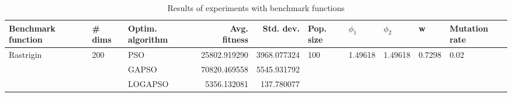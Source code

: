 \begin{table}
\centering
\caption{Results of experiments with benchmark functions}
\begin{tabular}{lllrrlllll}
\toprule
        Benchmark function &              \# dims & Optim. algorithm &  Avg. fitness &   Std. dev. &            Pop. size &               $\phi_{1}$ &               $\phi_{2}$ &                       w &         Mutation rate \\
\midrule
\multirow{3}{*}{Rastrigin} & \multirow{3}{*}{200} &              PSO &  25802.919290 & 3968.077324 & \multirow{3}{*}{100} & \multirow{3}{*}{1.49618} & \multirow{3}{*}{1.49618} & \multirow{3}{*}{0.7298} & \multirow{3}{*}{0.02} \\
                           &                      &            GAPSO &  70820.469558 & 5545.931792 &                      &                          &                          &                         &                       \\
                           &                      &          LOGAPSO &   5356.132081 &  137.780077 &                      &                          &                          &                         &                       \\
\bottomrule
\end{tabular}
\end{table}
